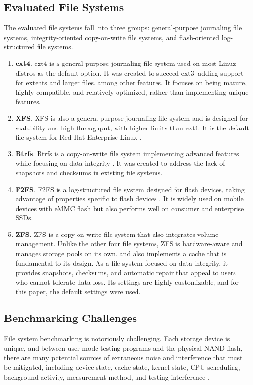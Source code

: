 \documentclass[letterpaper,twocolumn,10pt]{article}
\begin{document}
\subsection{Evaluated File Systems}
The evaluated file systems fall into three groups: general-purpose journaling file systems, integrity-oriented copy-on-write file systems, and flash-oriented log-structured file systems.
\begin{enumerate}
    \item \textbf{ext4}. ext4 is a general-purpose journaling file system used on most Linux distros as the default option. It was created to succeed ext3, adding support for extents and larger files, among other features. It focuses on being mature, highly compatible, and relatively optimized, rather than implementing unique features.
    \item \textbf{XFS}. XFS is also a general-purpose journaling file system and is designed for scalability and high throughput, with higher limits than ext4. It is the default file system for Red Hat Enterprise Linux \cite{rhel8_filesystems_overview}.
    \item \textbf{Btrfs}. Btrfs is a copy-on-write file system implementing advanced features while focusing on data integrity \cite{btrfs}. It was created to address the lack of snapshots and checksums in existing file systems.
    \item \textbf{F2FS}. F2FS is a log-structured file system designed for flash devices, taking advantage of properties specific to flash devices \cite{f2fs}. It is widely used on mobile devices with eMMC flash but also performs well on consumer and enterprise SSDs.
    \item \textbf{ZFS}. ZFS is a copy-on-write file system that also integrates volume management. Unlike the other four file systems, ZFS is hardware-aware and manages storage pools on its own, and also implements a cache that is fundamental to its design. As a file system focused on data integrity, it provides snapshots, checksums, and automatic repair that appeal to users who cannot tolerate data loss. Its settings are highly customizable, and for this paper, the default settings were used.
\end{enumerate}
\subsection{Benchmarking Challenges}
File system benchmarking is notoriously challenging. Each storage device is unique, and between user-mode testing programs and the physical NAND flash, there are many potential sources of extraneous noise and interference that must be mitigated, including device state, cache state, kernel state, CPU scheduling, background activity, measurement method, and testing interference \cite{dos_and_donts,benchmark_is_rocket_science}.
\end{document}
